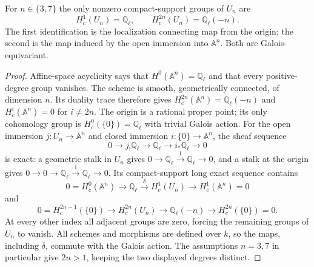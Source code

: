 \begin{lemma}\label{lem:cg-Un}
For $n\in\{3,7\}$ the only nonzero compact-support groups of $U_n$ are
\[
 H^1_c(U_n)=\mathbb Q_\ell,\qquad
 H^{2n}_c(U_n)=\mathbb Q_\ell(-n).
\]
The first identification is the localization connecting map from the
origin; the second is the map induced by the open immersion into
$\mathbb A^n$. Both are Galois-equivariant.
\end{lemma}
\begin{proof}
Affine-space acyclicity says that $H^0(\mathbb A^n)=\mathbb Q_\ell$
and that every positive-degree group vanishes. The scheme is smooth,
geometrically connected, of dimension $n$. Its duality trace therefore
gives $H^{2n}_c(\mathbb A^n)=\mathbb Q_\ell(-n)$ and
$H^i_c(\mathbb A^n)=0$ for $i\ne2n$. The origin is a rational
proper point; its only cohomology group is $H^0_c(\{0\})=\mathbb Q_\ell$
with trivial Galois action. For the open immersion $j:U_n\to\mathbb A^n$
and closed immersion $i:\{0\}\to\mathbb A^n$, the sheaf sequence
\[
 0\longrightarrow j_!\mathbb Q_\ell
 \longrightarrow\mathbb Q_\ell
 \longrightarrow i_*\mathbb Q_\ell\longrightarrow0
\]
is exact: a geometric stalk in $U_n$ gives $0\to\mathbb Q_\ell
\xrightarrow{1}\mathbb Q_\ell\to0$, and a stalk at the origin gives
$0\to0\to\mathbb Q_\ell\xrightarrow{1}\mathbb Q_\ell\to0$.
Its compact-support long exact sequence contains
\[
 0=H^0_c(\mathbb A^n)\longrightarrow\mathbb Q_\ell
 \xrightarrow{\delta}H^1_c(U_n)
 \longrightarrow H^1_c(\mathbb A^n)=0
\]
and
\[
 0=H^{2n-1}_c(\{0\})\longrightarrow H^{2n}_c(U_n)
 \longrightarrow\mathbb Q_\ell(-n)
 \longrightarrow H^{2n}_c(\{0\})=0.
\]
At every other index all adjacent groups are zero, forcing the remaining
groups of $U_n$ to vanish. All schemes and morphisms are defined over
$k$, so the maps, including $\delta$, commute with the Galois action.
The assumptions $n=3,7$ in particular give $2n>1$, keeping the two
displayed degrees distinct.
\end{proof}

